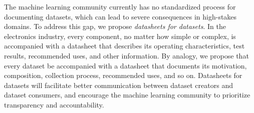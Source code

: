 The machine learning community currently has no standardized process
for documenting datasets, which can lead to severe consequences in high-stakes domains. To address this gap, we propose
\emph{datasheets for datasets}. In the electronics industry, every
component, no matter how simple or complex, is accompanied with a
datasheet that describes its operating characteristics, test results,
recommended uses, and other information. By analogy, we propose that
every dataset be accompanied with a datasheet that documents its
motivation, composition, collection process, recommended uses, and so
on. Datasheets for datasets will facilitate better communication
between dataset creators and dataset consumers, and encourage the
machine learning community to prioritize transparency and
accountability.

